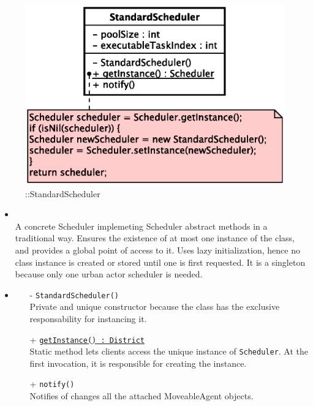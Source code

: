 \begin{figure}[h]
\centering
\includegraphics[scale=0.6,keepaspectratio]{images/solution/app/backend/standard_scheduler.eps}
\caption{\pScheduling::StandardScheduler}
\label{fig:sd-app-scheduling-standard-scheduler}
\end{figure}
\FloatBarrier
\begin{itemize}
  \item \textbf{\descr} \\
    A concrete Scheduler implemeting Scheduler abstract methods in a traditional way.
    Ensures the existence of at most one instance of the class, 
 	and provides a global point of access to it.
  	Uses lazy initialization, hence no class instance is created 
  	or stored until one is first requested.
    It is a singleton because only one urban actor scheduler is needed.
  \item \textbf{\ops}
  \begin{itemize}
    \item[-] \texttt{StandardScheduler()} \\
    Private and unique constructor because the class has the exclusive 
    responsability for instancing it.
    \item[+] \texttt{\underline{getInstance() : District}} \\
    Static method lets clients access the unique instance 
    of \texttt{Scheduler}. At the first invocation, it is responsible 
    for creating the instance.
    \item[+] \texttt{notify()} \\
	Notifies of changes all the attached MoveableAgent objects.
  \end{itemize}
\end{itemize}
